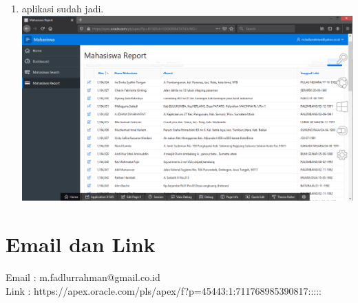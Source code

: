 \documentclass[12pt]{article}
\begin{document}
\begin{enumerate}
		\item aplikasi sudah jadi.\\
		\includegraphics[scale=0.3]{src/20}
	\end{enumerate}

\section*{Email dan Link}
Email	 : m.fadlurrahman@gmail.co.id \\
Link	 : https://apex.oracle.com/pls/apex/f?p=45443:1:711768985390817:::::
\end{document}
